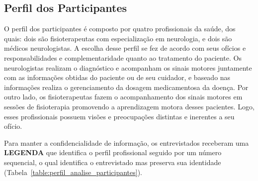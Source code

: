 
	


\subsection{Perfil dos Participantes}
O perfil dos participantes é composto por quatro profissionais da saúde, dos quais: dois são fisioterapeutas com especialização em neurologia, e dois são médicos neurologistas. A escolha desse perfil se fez de acordo com seus ofícios e responsabilidades e complementaridade quanto ao tratamento do paciente. Os neurologistas realizam o diagnóstico e acompanham os sinais motores juntamente com as informações obtidas do paciente ou de seu cuidador, e baseado nas informações realiza o gerenciamento da dosagem medicamentosa da doença. Por outro lado, os fisioterapeutas fazem o acompanhamento dos sinais motores em sessões de fisioterapia promovendo a aprendizagem motora desses pacientes. Logo, esses profissionais possuem visões e preocupações distintas e inerentes a seu ofício. 

Para manter a confidencialidade de informação, os entrevistados receberam uma \textbf{LEGENDA} que identifica o perfil profissional seguido por um número sequencial, o qual identifica o entrevistado mas preserva sua identidade (Tabela~\ref{table:perfil_analise_participantes}).

